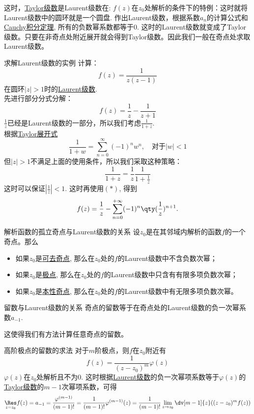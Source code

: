 \documentclass[UTF8]{ctexart}
\newcommand{\CauchyThm}{\hyperref[thm:Cauchy]{Cauchy积分定理}}
\begin{document}
这时，\hyperref[thm:TaylorSeries]{Taylor级数}是Laurent级数在: $f(z)$在$z_0$处解析的条件下的特例：这时就将Laurent级数中的圆环就是一个圆盘. 作出Laurent级数，根据系数$a_n$的计算公式和\CauchyThm , 所有的负数幂系数都等于0. 这时的Laurent级数就变成了Taylor级数。只要在非奇点处附近展开就会得到Taylor级数。因此我们一般在奇点处求取Laurent级数。
\begin{xmp}
    {求解Laurent级数的实例}
    计算：
    \[f(z)=\frac{1}{z(z-1)}\]
    在圆环$|z|>1$时的\hyperref[thm:Laurent]{Laurent级数}.\\
    先进行部分分式分解：
    \[f(z)=\frac{1}{z}-\frac{1}{z+1}\]
    $\frac{1}{z}$已经是Laurent级数的一部分，所以我们考虑$\frac{1}{1+z}$.\\
    根据\hyperref[xmp:TaylorCommon]{Taylor展开式}
    \[\frac{1}{1 + w} = \sum_{n=0}^{\infty} (-1)^n w^n, \quad \text{对于} |w| < 1\tag{$\ast$}\]
    但$|z|>1$不满足上面的使用条件，所以我们采取这种策略：
    \[\frac{1}{1+z}=\frac{1}{z}\frac{1}{1+\frac{1}{z}}\]
    这时可以保证$\left\lvert \frac{1}{z}\right\rvert <1$. 这时再使用$(\ast)$, 得到
    \[f(z)=\frac{1}{z}-\sum_{n=0}^{+\infty}(-1)^n\qty(\frac{1}{z})^{n+1}.\]
\end{xmp}
\begin{thm}
    {解析函数的孤立奇点与Laurent级数的关系}
    设$z_0$是在其邻域内解析的函数$f$的一个奇点。那么
    \begin{itemize}
        \item 如果$z_0$是\hyperref[dfn:RemovableSingularity]{可去奇点}, 那么在$z_0$处的$f$的Laurent级数中不含负数次幂；
        \item 如果$z_0$是\hyperref[dfn:PolarSingularity]{极点}, 那么在$z_0$处的$f$的Laurent级数中只含有有限多项负数次幂；
        \item 如果$z_0$是\hyperref[dfn:EssentialSingularity]{本性奇点}, 那么在$z_0$处的$f$的Laurent级数中有无限多项负数次幂。
    \end{itemize}
\end{thm}
\begin{crl}
    {留数与Laurent级数的关系}
    奇点的留数等于在奇点处的Laurent级数的负一次幂系数$a_{-1}$.
\end{crl}
这使得我们有方法计算任意奇点的留数。
\begin{crl}
    {高阶极点的留数的求法}
    对于$m$阶极点，则$f$在$z_0$附近有
    \[f(z)=\frac{1}{(z-z_0)^m}\varphi(z)\]
    $\varphi(z)$在$z_0$处解析且不为0. 这时根据\hyperref[thm:Laurent]{Laurent级数}的负一次幂项系数等于$\varphi(z)$的\hyperref[thm:TaylorSeries]{Taylor级数}的$m-1$次幂项系数，可得
    \[\underset{z=z_0}{\Res}f(z)=a_{-1}=\frac{\varphi^{(m-1)}}{(m-1)!}=\frac{1}{(m-1)!}\varphi^{(m-1)}(z)=\frac{1}{(m-1)!}\lim_{z\to z_0}\dv[m-1]{z}((z-z_0)^mf(z))\]
\end{crl}
\end{document}

